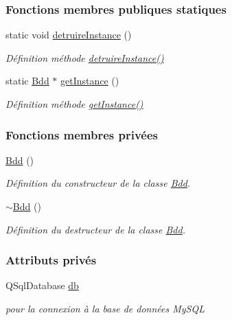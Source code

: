 \subsubsection*{Fonctions membres publiques statiques}
\begin{DoxyCompactItemize}
\item 
static void \hyperlink{class_bdd_af89fa3ffa107c7859a3964bf032cfdb7}{detruire\+Instance} ()
\begin{DoxyCompactList}\small\item\em Définition méthode \hyperlink{class_bdd_af89fa3ffa107c7859a3964bf032cfdb7}{detruire\+Instance()} \end{DoxyCompactList}\item 
static \hyperlink{class_bdd}{Bdd} $\ast$ \hyperlink{class_bdd_a6f55c29d593da12ca31fad02f5adfe24}{get\+Instance} ()
\begin{DoxyCompactList}\small\item\em Définition méthode \hyperlink{class_bdd_a6f55c29d593da12ca31fad02f5adfe24}{get\+Instance()} \end{DoxyCompactList}\end{DoxyCompactItemize}
\subsubsection*{Fonctions membres privées}
\begin{DoxyCompactItemize}
\item 
\hyperlink{class_bdd_a5306aeacb2baa3be8d4d3f8326527f60}{Bdd} ()
\begin{DoxyCompactList}\small\item\em Définition du constructeur de la classe \hyperlink{class_bdd}{Bdd}. \end{DoxyCompactList}\item 
\hyperlink{class_bdd_a5029277f27f8cfcf9d8603fb331a15dd}{$\sim$\+Bdd} ()
\begin{DoxyCompactList}\small\item\em Définition du destructeur de la classe \hyperlink{class_bdd}{Bdd}. \end{DoxyCompactList}\end{DoxyCompactItemize}
\subsubsection*{Attributs privés}
\begin{DoxyCompactItemize}
\item 
Q\+Sql\+Database \hyperlink{class_bdd_a8628c1686deda86999f86689c3e7268e}{db}
\begin{DoxyCompactList}\small\item\em pour la connexion à la base de données My\+S\+QL \end{DoxyCompactList}\end{DoxyCompactItemize}
